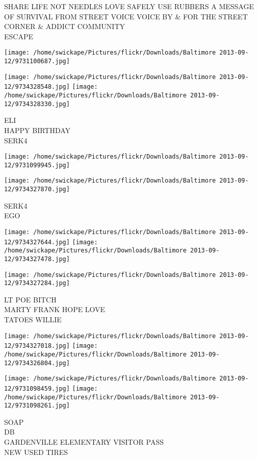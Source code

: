 \documentclass[10pt,letterpaper]{article}
\begin{document}
SHARE LIFE NOT NEEDLES LOVE SAFELY USE RUBBERS A MESSAGE OF SURVIVAL FROM STREET VOICE VOICE BY \& FOR THE STREET CORNER \& ADDICT COMMUNITY\\
ESCAPE
\pagebreak

\texttt{[image: /home/swickape/Pictures/flickr/Downloads/Baltimore 2013-09-12/9731100687.jpg]}

\vspace{0.25in}
\texttt{[image: /home/swickape/Pictures/flickr/Downloads/Baltimore 2013-09-12/9734328548.jpg]}
\texttt{[image: /home/swickape/Pictures/flickr/Downloads/Baltimore 2013-09-12/9734328330.jpg]}

ELI\\
HAPPY BIRTHDAY\\
SERK4
\pagebreak

\texttt{[image: /home/swickape/Pictures/flickr/Downloads/Baltimore 2013-09-12/9731099945.jpg]}

\vspace{0.25in}
\texttt{[image: /home/swickape/Pictures/flickr/Downloads/Baltimore 2013-09-12/9734327870.jpg]}

SERK4\\
EGO
\pagebreak

\texttt{[image: /home/swickape/Pictures/flickr/Downloads/Baltimore 2013-09-12/9734327644.jpg]}
\texttt{[image: /home/swickape/Pictures/flickr/Downloads/Baltimore 2013-09-12/9734327478.jpg]}

\vspace{0.25in}
\texttt{[image: /home/swickape/Pictures/flickr/Downloads/Baltimore 2013-09-12/9734327284.jpg]}

LT POE BITCH\\
MARTY FRANK HOPE LOVE\\
TATOES WILLIE
\pagebreak

\texttt{[image: /home/swickape/Pictures/flickr/Downloads/Baltimore 2013-09-12/9734327018.jpg]}
\texttt{[image: /home/swickape/Pictures/flickr/Downloads/Baltimore 2013-09-12/9734326804.jpg]}

\texttt{[image: /home/swickape/Pictures/flickr/Downloads/Baltimore 2013-09-12/9731098459.jpg]}
\texttt{[image: /home/swickape/Pictures/flickr/Downloads/Baltimore 2013-09-12/9731098261.jpg]}

SOAP\\
DB\\
GARDENVILLE ELEMENTARY VISITOR PASS\\
NEW USED TIRES
\pagebreak
\end{document}
